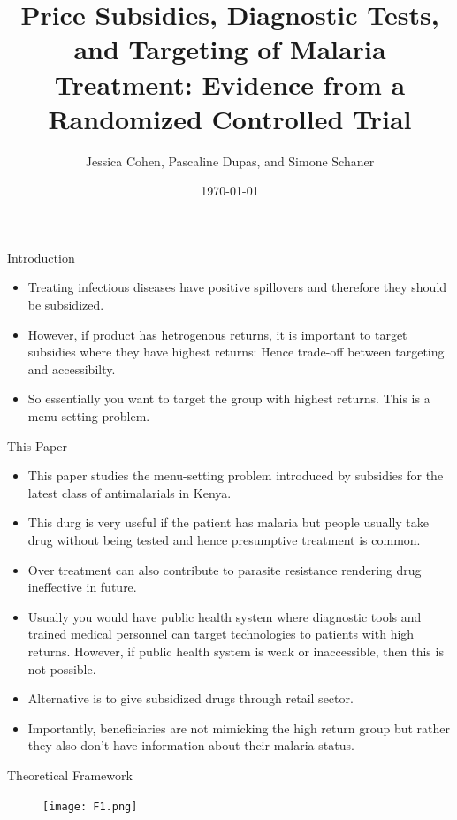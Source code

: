 \documentclass{beamer}
\begin{document}
\title{Price Subsidies, Diagnostic Tests, and Targeting of Malaria Treatment: Evidence from a Randomized Controlled Trial}
\author{Jessica Cohen, Pascaline Dupas, and Simone Schaner}
\date{\today}

\frame{\titlepage}

\begin{frame}{Introduction}
    \begin{itemize}
        \item Treating infectious diseases have positive spillovers and therefore they should be subsidized. 
        \item However, if product has hetrogenous returns, it is important to target subsidies where they have highest returns: Hence trade-off between targeting and accessibilty. 
        \item So essentially you want to target the group with highest returns. This is a menu-setting problem. 
    \end{itemize}
\end{frame}

\begin{frame}{This Paper}
\begin{itemize}
    \item This paper studies the menu-setting problem introduced by subsidies for the latest class of antimalarials in Kenya.
    \item This durg is very useful if the patient has malaria but people usually take drug without being tested and hence presumptive treatment is common.
    \item Over treatment can also contribute to parasite resistance rendering drug ineffective in future.
    \item Usually you would have public health system where diagnostic tools and trained medical personnel can target technologies to patients with high returns. However, if public health system is weak or inaccessible, then this is not possible.
    \item Alternative is to give subsidized drugs through retail sector. 
    \item Importantly, beneficiaries are not mimicking the high return group but rather they also don't have information about their malaria status.
\end{itemize}
\end{frame}

\begin{frame}{Theoretical Framework}

\begin{figure}
    \texttt{[image: F1.png]}
\end{figure}

\end{frame}
    
\end{document}
